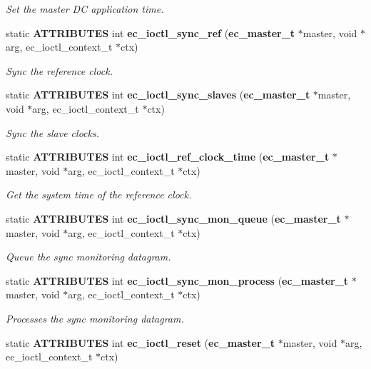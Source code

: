 \begin{DoxyCompactItemize}
\begin{DoxyCompactList}\small\item\em Set the master D\-C application time. \end{DoxyCompactList}\item 
static {\bf A\-T\-T\-R\-I\-B\-U\-T\-E\-S} int {\bf ec\-\_\-ioctl\-\_\-sync\-\_\-ref} ({\bf ec\-\_\-master\-\_\-t} $\ast$master, void $\ast$arg, ec\-\_\-ioctl\-\_\-context\-\_\-t $\ast$ctx)
\begin{DoxyCompactList}\small\item\em Sync the reference clock. \end{DoxyCompactList}\item 
static {\bf A\-T\-T\-R\-I\-B\-U\-T\-E\-S} int {\bf ec\-\_\-ioctl\-\_\-sync\-\_\-slaves} ({\bf ec\-\_\-master\-\_\-t} $\ast$master, void $\ast$arg, ec\-\_\-ioctl\-\_\-context\-\_\-t $\ast$ctx)
\begin{DoxyCompactList}\small\item\em Sync the slave clocks. \end{DoxyCompactList}\item 
static {\bf A\-T\-T\-R\-I\-B\-U\-T\-E\-S} int {\bf ec\-\_\-ioctl\-\_\-ref\-\_\-clock\-\_\-time} ({\bf ec\-\_\-master\-\_\-t} $\ast$master, void $\ast$arg, ec\-\_\-ioctl\-\_\-context\-\_\-t $\ast$ctx)
\begin{DoxyCompactList}\small\item\em Get the system time of the reference clock. \end{DoxyCompactList}\item 
static {\bf A\-T\-T\-R\-I\-B\-U\-T\-E\-S} int {\bf ec\-\_\-ioctl\-\_\-sync\-\_\-mon\-\_\-queue} ({\bf ec\-\_\-master\-\_\-t} $\ast$master, void $\ast$arg, ec\-\_\-ioctl\-\_\-context\-\_\-t $\ast$ctx)
\begin{DoxyCompactList}\small\item\em Queue the sync monitoring datagram. \end{DoxyCompactList}\item 
static {\bf A\-T\-T\-R\-I\-B\-U\-T\-E\-S} int {\bf ec\-\_\-ioctl\-\_\-sync\-\_\-mon\-\_\-process} ({\bf ec\-\_\-master\-\_\-t} $\ast$master, void $\ast$arg, ec\-\_\-ioctl\-\_\-context\-\_\-t $\ast$ctx)
\begin{DoxyCompactList}\small\item\em Processes the sync monitoring datagram. \end{DoxyCompactList}\item 
static {\bf A\-T\-T\-R\-I\-B\-U\-T\-E\-S} int {\bf ec\-\_\-ioctl\-\_\-reset} ({\bf ec\-\_\-master\-\_\-t} $\ast$master, void $\ast$arg, ec\-\_\-ioctl\-\_\-context\-\_\-t $\ast$ctx)

\end{DoxyCompactItemize}
